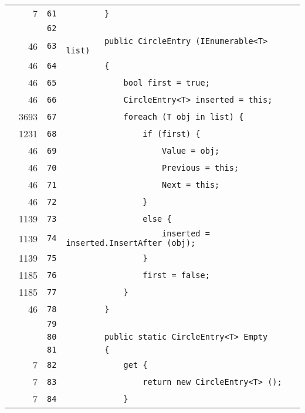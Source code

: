 \documentclass[a4paper,10pt]{article}
\begin{document}
\begin{longtable}[l]{lrrl}
\cellcolor{green} & 7 & \verb~61~ & \verb~        }~\\
\cellcolor{gray} &  & \verb~62~ & \verb~~\\
\cellcolor{green} & 46 & \verb~63~ & \verb~        public CircleEntry (IEnumerable<T> list)~\\
\cellcolor{green} & 46 & \verb~64~ & \verb~        {~\\
\cellcolor{green} & 46 & \verb~65~ & \verb~            bool first = true;~\\
\cellcolor{green} & 46 & \verb~66~ & \verb~            CircleEntry<T> inserted = this;~\\
\cellcolor{green} & 3693 & \verb~67~ & \verb~            foreach (T obj in list) {~\\
\cellcolor{green} & 1231 & \verb~68~ & \verb~                if (first) {~\\
\cellcolor{green} & 46 & \verb~69~ & \verb~                    Value = obj;~\\
\cellcolor{green} & 46 & \verb~70~ & \verb~                    Previous = this;~\\
\cellcolor{green} & 46 & \verb~71~ & \verb~                    Next = this;~\\
\cellcolor{green} & 46 & \verb~72~ & \verb~                }~\\
\cellcolor{green} & 1139 & \verb~73~ & \verb~                else {~\\
\cellcolor{green} & 1139 & \verb~74~ & \verb~                    inserted = inserted.InsertAfter (obj);~\\
\cellcolor{green} & 1139 & \verb~75~ & \verb~                }~\\
\cellcolor{green} & 1185 & \verb~76~ & \verb~                first = false;~\\
\cellcolor{green} & 1185 & \verb~77~ & \verb~            }~\\
\cellcolor{green} & 46 & \verb~78~ & \verb~        }~\\
\cellcolor{gray} &  & \verb~79~ & \verb~~\\
\cellcolor{gray} &  & \verb~80~ & \verb~        public static CircleEntry<T> Empty~\\
\cellcolor{gray} &  & \verb~81~ & \verb~        {~\\
\cellcolor{green} & 7 & \verb~82~ & \verb~            get {~\\
\cellcolor{green} & 7 & \verb~83~ & \verb~                return new CircleEntry<T> ();~\\
\cellcolor{green} & 7 & \verb~84~ & \verb~            }~\\

\end{longtable}
\end{document}
